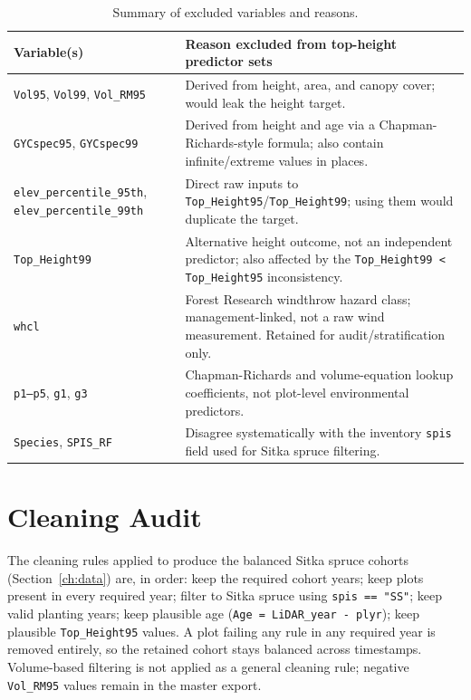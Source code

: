 \begin{table}[h]
\centering
\begin{tabular}{lp{9cm}}
\toprule
Variable(s) & Reason excluded from top-height predictor sets \\
\midrule
\texttt{Vol95}, \texttt{Vol99}, \texttt{Vol\_RM95} & Derived from height, area, and canopy cover; would leak the height target. \\
\texttt{GYCspec95}, \texttt{GYCspec99} & Derived from height and age via a Chapman-Richards-style formula; also contain infinite/extreme values in places. \\
\texttt{elev\_percentile\_95th}, \texttt{elev\_percentile\_99th} & Direct raw inputs to \texttt{Top\_Height95}/\texttt{Top\_Height99}; using them would duplicate the target. \\
\texttt{Top\_Height99} & Alternative height outcome, not an independent predictor; also affected by the \texttt{Top\_Height99 < Top\_Height95} inconsistency. \\
\texttt{whcl} & Forest Research windthrow hazard class; management-linked, not a raw wind measurement. Retained for audit/stratification only. \\
\texttt{p1--p5}, \texttt{g1}, \texttt{g3} & Chapman-Richards and volume-equation lookup coefficients, not plot-level environmental predictors. \\
\texttt{Species}, \texttt{SPIS\_RF} & Disagree systematically with the inventory \texttt{spis} field used for Sitka spruce filtering. \\
\bottomrule
\end{tabular}
\caption{Summary of excluded variables and reasons.}
\end{table}

\chapter{Cleaning Audit}
\label{app:cleaning-audit}

The cleaning rules applied to produce the balanced Sitka spruce cohorts (Section~\ref{ch:data}) are, in order: keep the required cohort years; keep plots present in every required year; filter to Sitka spruce using \texttt{spis == "SS"}; keep valid planting years; keep plausible age (\texttt{Age = LiDAR\_year - plyr}); keep plausible \texttt{Top\_Height95} values. A plot failing any rule in any required year is removed entirely, so the retained cohort stays balanced across timestamps. Volume-based filtering is not applied as a general cleaning rule; negative \texttt{Vol\_RM95} values remain in the master export.

